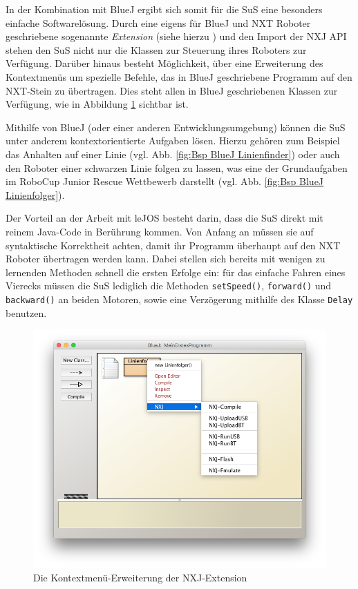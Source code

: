 \documentclass[paper=a4, DIV=calc, BCOR=12mm, twoside=on, onecolumn=on, open = right, titlepage =on, parskip =half-, headsepline = on, footsepline = off, chapterprefix = off, appendixprefix = on, fontsize = 12pt, numbers = noenddot, abstract = on]{scrbook}
\begin{document}
In der Kombination mit BlueJ ergibt sich somit für die SuS eine besonders einfache Softwarelösung. Durch eine eigens für BlueJ und NXT Roboter geschriebene sogenannte \textit{Extension} (siehe hierzu \cite{bowes:12}) und den Import der NXJ API stehen den SuS nicht nur die Klassen zur Steuerung ihres Roboters zur Verfügung. Darüber hinaus besteht Möglichkeit, über eine Erweiterung des Kontextmenüs um spezielle Befehle, das in BlueJ geschriebene Programm auf den NXT-Stein zu übertragen. Dies steht allen in BlueJ geschriebenen Klassen zur Verfügung, wie in Abbildung \ref{fig:extension} sichtbar ist.


Mithilfe von BlueJ (oder einer anderen Entwicklungsumgebung) können die SuS unter anderem kontextorientierte Aufgaben lösen. Hierzu gehören zum Beispiel das Anhalten auf einer Linie (vgl. Abb. \ref{fig:Bsp BlueJ Linienfinder}) oder auch den Roboter einer schwarzen Linie folgen zu lassen, was eine der Grundaufgaben im RoboCup Junior Rescue Wettbewerb darstellt (vgl. Abb. \ref{fig:Bsp BlueJ Linienfolger}).



Der Vorteil an der Arbeit mit leJOS besteht darin, dass die SuS direkt mit reinem Java-Code in Berührung kommen. Von Anfang an müssen sie auf syntaktische Korrektheit achten, damit ihr Programm überhaupt auf den NXT Roboter übertragen werden kann. Dabei stellen sich bereits mit wenigen zu lernenden Methoden schnell die ersten Erfolge ein: für das einfache Fahren eines Vierecks müssen die SuS lediglich die  Methoden \texttt{setSpeed()}, \texttt{forward()} und \texttt{backward()} an beiden Motoren, sowie eine Verzögerung mithilfe des Klasse \texttt{Delay} benutzen. 

\vspace*{2ex}
\begin{figure}[htbp]
\centering
\includegraphics[width=\textwidth]{images/extension.png}
\caption{Die Kontextmenü-Erweiterung der NXJ-Extension}
\label{fig:extension}
\end{figure}
\end{document}
